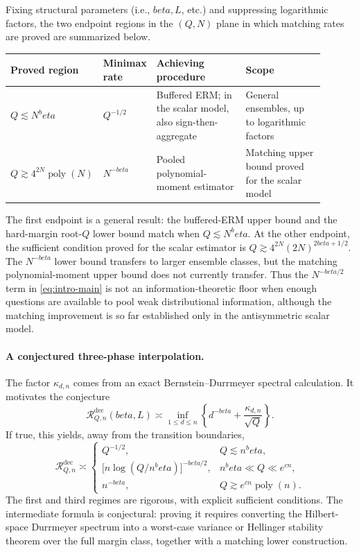 \documentclass[11pt]{article}
\def\beta{beta}%
\newcommand{\calR}{\mathcal R}
\begin{document}
Fixing structural parameters (i.e., $\beta, L$, etc.) and suppressing logarithmic factors, the two endpoint regions in the $(Q,N)$ plane in which matching rates are proved are summarized below.
\begin{center}
\small
\begin{tabular}{@{}L{0.18\linewidth}L{0.14\linewidth}L{0.31\linewidth}L{0.27\linewidth}@{}}
\toprule
Proved region & Minimax rate & Achieving procedure & Scope \\
\midrule
$Q\lesssim N^\beta$
& $Q^{-1/2}$
& Buffered ERM; in the scalar model, also sign-then-aggregate
& General ensembles, up to logarithmic factors \\
$Q\gtrsim 4^{2N}\operatorname{poly}(N)$
& $N^{-\beta}$
& Pooled polynomial-moment estimator
& Matching upper bound proved for the scalar model \\
\bottomrule
\end{tabular}
\end{center}
The first endpoint is a general result: the buffered-ERM upper bound and the hard-margin root-$Q$ lower bound match when $Q\lesssim N^\beta$.  At the other endpoint, the sufficient condition proved for the scalar estimator is $Q\gtrsim 4^{2N}(2N)^{2\beta+1/2}$.  The $N^{-\beta}$ lower bound transfers to larger ensemble classes, but the matching polynomial-moment upper bound does not currently transfer.  Thus the $N^{-\beta/2}$ term in \eqref{eq:intro-main} is not an information-theoretic floor when enough questions are available to pool weak distributional information, although the matching improvement is so far established only in the antisymmetric scalar model.

\paragraph{A conjectured three-phase interpolation.}
The factor $\kappa_{d,n}$ comes from an exact Bernstein--Durrmeyer spectral calculation.  It motivates the conjecture
\[
\calR^{\mathrm{dec}}_{Q,n}(\beta,L)
\asymp
\inf_{1\le d\le n}
\left\{
d^{-\beta}
+
\frac{\kappa_{d,n}}{\sqrt Q}
\right\}.
\]
If true, this yields, away from the transition boundaries,
\[
\calR^{\mathrm{dec}}_{Q,n}
\asymp
\begin{cases}
Q^{-1/2},
&Q\lesssim n^\beta,\\[0.8ex]
\bigl[n\log(Q/n^\beta)\bigr]^{-\beta/2},
&n^\beta\ll Q\ll e^{cn},\\[0.8ex]
n^{-\beta},
&Q\gtrsim e^{cn}\operatorname{poly}(n).
\end{cases}
\]
The first and third regimes are rigorous, with explicit sufficient conditions.  The intermediate formula is conjectural: proving it requires converting the Hilbert-space Durrmeyer spectrum into a worst-case variance or Hellinger stability theorem over the full margin class, together with a matching lower construction.
\end{document}
